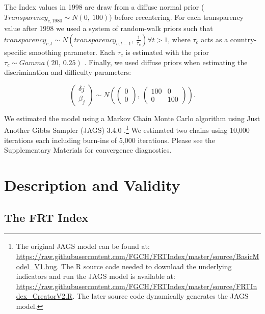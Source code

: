 \documentclass[a4paper]{article}
\begin{document}
The Index values in 1998 are draw from a diffuse normal prior ($Transparency_{c,1980} \sim N(0,\:100)$) before recentering. For each transparency value after 1998 we used a system of random-walk priors such that $transparency_{c,t} \sim N(transparency_{c,t-1},\: \frac{1}{\tau_{c}}) \forall t > 1$, where $\tau_{c}$ acts as a country-specific smoothing parameter. Each $\tau_{c}$ is estimated with the prior $\tau_{c} \sim Gamma(20,\:0.25)$ \citep[for more details see][8]{Jackman2009,Hollyer2014}. Finally, we used diffuse priors when estimating the discrimination and difficulty parameters:

\begin{equation}
    \begin{pmatrix}
      \delta{j} \\
      \beta_{j}
    \end{pmatrix} 
    \sim N 
    \left(
        \begin{pmatrix} 
            0 \\
            0 
        \end{pmatrix}
            ,\:
        \begin{pmatrix} 
            100 & 0 \\
            0 & 100
        \end{pmatrix}
    \right). 
\end{equation}

We estimated the model using a Markov Chain Monte Carlo algorithm using Just Another Gibbs Sampler (JAGS) 3.4.0 \citep{Plummer2003}.\footnote{The original JAGS model can be found at: \url{https://raw.githubusercontent.com/FGCH/FRTIndex/master/source/BasicModel_V1.bug}. The R \citep{RCite} source code needed to download the underlying indicators and run the JAGS model is available at: \url{https://raw.githubusercontent.com/FGCH/FRTIndex/master/source/FRTIndex_CreatorV2.R}. The later source code dynamically generates the JAGS model.} We estimated two chains using 10,000 iterations each including burn-ins of 5,000 iterations. Please see the Supplementary Materials for convergence diagnostics. 


\section{Description and Validity}


\subsection{The FRT Index}
\end{document}
